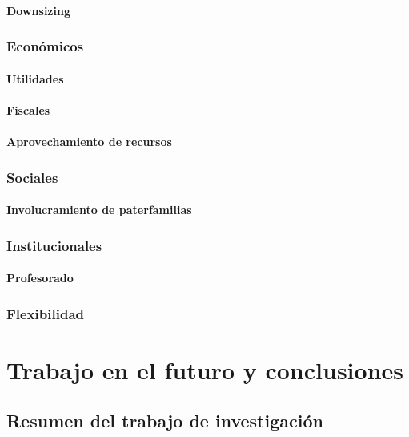 \documentclass[draft,12pt,headsepline,footsepline,paper=letter]{scrreprt}
\begin{document}
\subsubsection{Downsizing}

\subsection{Económicos}

\subsubsection{Utilidades}

\subsubsection{Fiscales}

\subsubsection{Aprovechamiento de recursos}

\subsection{Sociales}

\subsubsection{Involucramiento de paterfamilias}

\subsection{Institucionales}

\subsubsection{Profesorado}

\subsection{Flexibilidad}

\chapter{Trabajo en el futuro y conclusiones}

\section{Resumen del trabajo de investigación}
\end{document}
